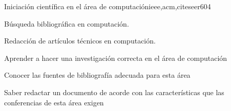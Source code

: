 \begin{syllabus}
\begin{unit}{Iniciación científica en el área de computación}{ieee,acm,citeseer}{60}{4}
  \begin{topics}
      \item Búsqueda bibliográfica en computación.
      \item Redacción de artículos técnicos en computación.
  \end{topics}
  \begin{learningoutcomes}
      \item Aprender a hacer una investigación correcta en el área de computación
      \item Conocer las fuentes de bibliografía adecuada para esta área
      \item Saber redactar un documento de acorde con las características que las conferencias de esta área exigen
  \end{learningoutcomes}
\end{unit}

\begin{comment}
algunos comentarios locos \abchfs
\end{comment}



\begin{coursebibliography}
\end{coursebibliography}

\end{syllabus}
